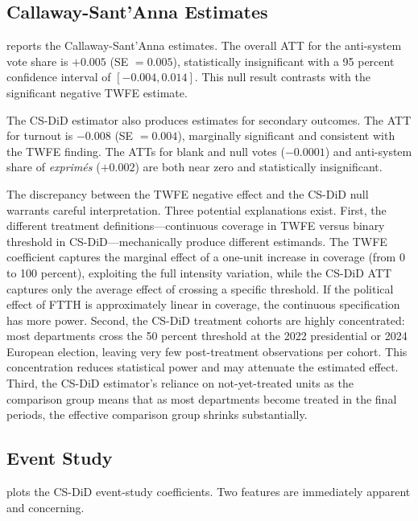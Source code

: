 \documentclass[12pt]{article}
\begin{document}


\subsection{Callaway-Sant'Anna Estimates}

 reports the Callaway-Sant'Anna estimates. The overall ATT for the anti-system vote share is $+0.005$ (SE $= 0.005$), statistically insignificant with a 95 percent confidence interval of $[-0.004, 0.014]$. This null result contrasts with the significant negative TWFE estimate.

The CS-DiD estimator also produces estimates for secondary outcomes. The ATT for turnout is $-0.008$ (SE $= 0.004$), marginally significant and consistent with the TWFE finding. The ATTs for blank and null votes ($-0.0001$) and anti-system share of \emph{exprim\'es} ($+0.002$) are both near zero and statistically insignificant.

The discrepancy between the TWFE negative effect and the CS-DiD null warrants careful interpretation. Three potential explanations exist. First, the different treatment definitions---continuous coverage in TWFE versus binary threshold in CS-DiD---mechanically produce different estimands. The TWFE coefficient captures the marginal effect of a one-unit increase in coverage (from 0 to 100 percent), exploiting the full intensity variation, while the CS-DiD ATT captures only the average effect of crossing a specific threshold. If the political effect of FTTH is approximately linear in coverage, the continuous specification has more power. Second, the CS-DiD treatment cohorts are highly concentrated: most departments cross the 50 percent threshold at the 2022 presidential or 2024 European election, leaving very few post-treatment observations per cohort. This concentration reduces statistical power and may attenuate the estimated effect. Third, the CS-DiD estimator's reliance on not-yet-treated units as the comparison group means that as most departments become treated in the final periods, the effective comparison group shrinks substantially.



\subsection{Event Study}

 plots the CS-DiD event-study coefficients. Two features are immediately apparent and concerning.
\end{document}
